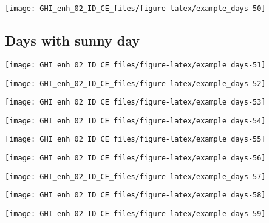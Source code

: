 \documentclass[
  10pt,
  a4paper,oneside]{article}
\begin{document}
\begin{center}\texttt{[image: GHI\_enh\_02\_ID\_CE\_files/figure-latex/example\_days-50]} \end{center}

\FloatBarrier

\hypertarget{days-with-sunny-day}{%
\subsection{Days with sunny day}\label{days-with-sunny-day}}

\begin{center}\texttt{[image: GHI\_enh\_02\_ID\_CE\_files/figure-latex/example\_days-51]} \end{center}

\begin{center}\texttt{[image: GHI\_enh\_02\_ID\_CE\_files/figure-latex/example\_days-52]} \end{center}

\begin{center}\texttt{[image: GHI\_enh\_02\_ID\_CE\_files/figure-latex/example\_days-53]} \end{center}

\begin{center}\texttt{[image: GHI\_enh\_02\_ID\_CE\_files/figure-latex/example\_days-54]} \end{center}

\begin{center}\texttt{[image: GHI\_enh\_02\_ID\_CE\_files/figure-latex/example\_days-55]} \end{center}

\begin{center}\texttt{[image: GHI\_enh\_02\_ID\_CE\_files/figure-latex/example\_days-56]} \end{center}

\begin{center}\texttt{[image: GHI\_enh\_02\_ID\_CE\_files/figure-latex/example\_days-57]} \end{center}

\begin{center}\texttt{[image: GHI\_enh\_02\_ID\_CE\_files/figure-latex/example\_days-58]} \end{center}

\begin{center}\texttt{[image: GHI\_enh\_02\_ID\_CE\_files/figure-latex/example\_days-59]} \end{center}
\end{document}

